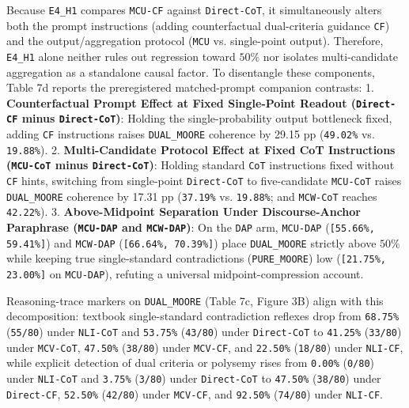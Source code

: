 \documentclass[11pt,a4paper]{article}
\begin{document}
Because \texttt{E4\_\allowbreak{}H1} compares \texttt{MCU-\allowbreak{}CF} against \texttt{Direct-\allowbreak{}CoT}, it simultaneously alters both the prompt instructions (adding counterfactual dual-criteria guidance \texttt{CF}) and the output/aggregation protocol (\texttt{MCU} vs. single-point output). Therefore, \texttt{E4\_\allowbreak{}H1} alone neither rules out regression toward $50\%$ nor isolates multi-candidate aggregation as a standalone causal factor. To disentangle these components, Table 7d reports the preregistered matched-prompt companion contrasts:
1. \textbf{Counterfactual Prompt Effect at Fixed Single-Point Readout (\texttt{Direct-\allowbreak{}CF} minus \texttt{Direct-\allowbreak{}CoT})}: Holding the single-probability output bottleneck fixed, adding \texttt{CF} instructions raises \texttt{DUAL\_\allowbreak{}MOORE} coherence by 29.15 pp (\texttt{49.02\%} vs. \texttt{19.88\%}).
2. \textbf{Multi-Candidate Protocol Effect at Fixed CoT Instructions (\texttt{MCU-\allowbreak{}CoT} minus \texttt{Direct-\allowbreak{}CoT})}: Holding standard \texttt{CoT} instructions fixed without \texttt{CF} hints, switching from single-point \texttt{Direct-\allowbreak{}CoT} to five-candidate \texttt{MCU-\allowbreak{}CoT} raises \texttt{DUAL\_\allowbreak{}MOORE} coherence by 17.31 pp (\texttt{37.19\%} vs. \texttt{19.88\%}; and \texttt{MCW-\allowbreak{}CoT} reaches \texttt{42.22\%}).
3. \textbf{Above-Midpoint Separation Under Discourse-Anchor Paraphrase (\texttt{MCU-\allowbreak{}DAP} and \texttt{MCW-\allowbreak{}DAP})}: On the \texttt{DAP} arm, \texttt{MCU-\allowbreak{}DAP} (\texttt{[55.66\%, 59.41\%]}) and \texttt{MCW-\allowbreak{}DAP} (\texttt{[66.64\%, 70.39\%]}) place \texttt{DUAL\_\allowbreak{}MOORE} strictly above $50\%$ while keeping true single-standard contradictions (\texttt{PURE\_\allowbreak{}MOORE}) low (\texttt{[21.75\%, 23.00\%]} on \texttt{MCU-\allowbreak{}DAP}), refuting a universal midpoint-compression account.

Reasoning-trace markers on \texttt{DUAL\_\allowbreak{}MOORE} (Table 7c, Figure 3B) align with this decomposition: textbook single-standard contradiction reflexes drop from \texttt{68.75\%} (\texttt{55/\allowbreak{}80}) under \texttt{NLI-\allowbreak{}CoT} and \texttt{53.75\%} (\texttt{43/\allowbreak{}80}) under \texttt{Direct-\allowbreak{}CoT} to \texttt{41.25\%} (\texttt{33/\allowbreak{}80}) under \texttt{MCV-\allowbreak{}CoT}, \texttt{47.50\%} (\texttt{38/\allowbreak{}80}) under \texttt{MCV-\allowbreak{}CF}, and \texttt{22.50\%} (\texttt{18/\allowbreak{}80}) under \texttt{NLI-\allowbreak{}CF}, while explicit detection of dual criteria or polysemy rises from \texttt{0.00\%} (\texttt{0/\allowbreak{}80}) under \texttt{NLI-\allowbreak{}CoT} and \texttt{3.75\%} (\texttt{3/\allowbreak{}80}) under \texttt{Direct-\allowbreak{}CoT} to \texttt{47.50\%} (\texttt{38/\allowbreak{}80}) under \texttt{Direct-\allowbreak{}CF}, \texttt{52.50\%} (\texttt{42/\allowbreak{}80}) under \texttt{MCV-\allowbreak{}CF}, and \texttt{92.50\%} (\texttt{74/\allowbreak{}80}) under \texttt{NLI-\allowbreak{}CF}.
\end{document}

